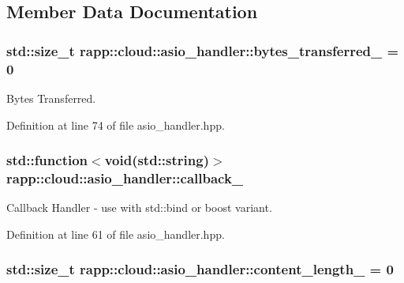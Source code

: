 \subsection{Member Data Documentation}
\hypertarget{classrapp_1_1cloud_1_1asio__handler_a4c34ea05512283dade9bcdcf5b7c589e}{
\subsubsection[{bytes\-\_\-transferred\-\_\-}]{\setlength{\rightskip}{0pt plus 5cm}std\-::size\-\_\-t rapp\-::cloud\-::asio\-\_\-handler\-::bytes\-\_\-transferred\-\_\- = 0\hspace{0.3cm}{\ttfamily [protected]}}}\label{classrapp_1_1cloud_1_1asio__handler_a4c34ea05512283dade9bcdcf5b7c589e}


Bytes Transferred. 



Definition at line 74 of file asio\-\_\-handler.\-hpp.

\hypertarget{classrapp_1_1cloud_1_1asio__handler_a3a10b61382fd8ae1be4d0208228cbe00}{
\subsubsection[{callback\-\_\-}]{\setlength{\rightskip}{0pt plus 5cm}std\-::function$<$void(std\-::string)$>$ rapp\-::cloud\-::asio\-\_\-handler\-::callback\-\_\-\hspace{0.3cm}{\ttfamily [protected]}}}\label{classrapp_1_1cloud_1_1asio__handler_a3a10b61382fd8ae1be4d0208228cbe00}


Callback Handler -\/ use with std\-::bind or boost variant. 



Definition at line 61 of file asio\-\_\-handler.\-hpp.

\hypertarget{classrapp_1_1cloud_1_1asio__handler_add9ab3624ffe98259435ba5bdf37b8f2}{
\subsubsection[{content\-\_\-length\-\_\-}]{\setlength{\rightskip}{0pt plus 5cm}std\-::size\-\_\-t rapp\-::cloud\-::asio\-\_\-handler\-::content\-\_\-length\-\_\- = 0\hspace{0.3cm}{\ttfamily [protected]}}}\label{classrapp_1_1cloud_1_1asio__handler_add9ab3624ffe98259435ba5bdf37b8f2}


